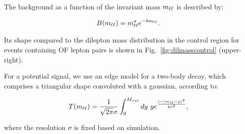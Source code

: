 The background as a function of the invariant mass $m_{\ell\ell}$ is described by:

\begin{equation}
B(m_{\ell\ell}) = m_{\ell\ell}^a e^{-b m_{\ell\ell}}.
\end{equation}

Its shape compared to the dilepton mass distribution in the control region
for events containing OF lepton pairs is shown in Fig.~\ref{fig:dilmasscontrol} (upper-right).

For a potential signal, we use an edge model for a two-body decay, 
which comprises a triangular shape convoluted with a gaussian,
according to:

\begin{equation}
T(m_{\ell\ell}) = \frac{1}{\sqrt{2\pi}\sigma}\int_0^{M_{cut}} dy~y e^{\frac{(-(m_{\ell\ell}-y)^2}{2\sigma^2}},
\end{equation}

where the resolution $\sigma$ is fixed based on simulation.

